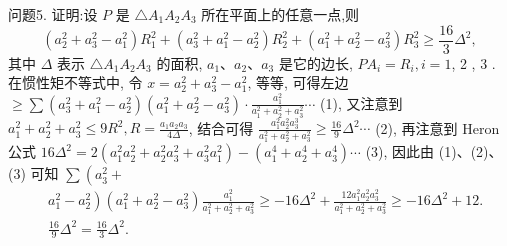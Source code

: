问题5. 证明:设 $P$ 是 $\triangle A_1 A_2 A_3$ 所在平面上的任意一点,则
$$
\left(a_2^2+a_3^2-a_1^2\right) R_1^2+\left(a_3^2+a_1^2-a_2^2\right) R_2^2+\left(a_1^2+a_2^2-a_3^2\right) R_3^2 \geqslant \frac{16}{3} \Delta^2,
$$
其中 $\Delta$ 表示 $\triangle A_1 A_2 A_3$ 的面积, $a_1 、 a_2 、 a_3$ 是它的边长, $P A_i=R_i, i=1$, 2 , 3 .
在惯性矩不等式中, 令 $x=a_2^2+a_3^2-a_1^2$, 等等, 可得左边 $\geqslant \sum\left(a_3^2+\right. \left.a_1^2-a_2^2\right)\left(a_1^2+a_2^2-a_3^2\right) \cdot \frac{a_1^2}{a_1^2+a_2^2+a_3^2} \cdots$ (1), 又注意到 $a_1^2+a_2^2+a_3^2 \leqslant 9 R^2, R= \frac{a_1 a_2 a_3}{4 \Delta}$, 结合可得 $\frac{a_1^2 a_2^2 a_3^3}{a_1^2+a_2^2+a_3^2} \geqslant \frac{16}{9} \Delta^2 \cdots$ (2), 再注意到 Heron 公式 $16 \Delta^2= 2\left(a_1^2 a_2^2+a_2^2 a_3^2+a_3^2 a_1^2\right)-\left(a_1^4+a_2^4+a_3^4\right) \cdots$ (3), 因此由 (1)、(2)、(3) 可知 $\sum\left(a_3^2+\right.$
$$
\begin{aligned}
& \left.a_1^2-a_2^2\right)\left(a_1^2+a_2^2-a_3^2\right) \frac{a_1^2}{a_1^2+a_2^2+a_3^2} \geqslant-16 \Delta^2+\frac{12 a_1^2 a_2^2 a_3^2}{a_1^2+a_2^2+a_3^2} \geqslant-16 \Delta^2+12 . \\
& \frac{16}{9} \Delta^2=\frac{16}{3} \Delta^2 .
\end{aligned}
$$


